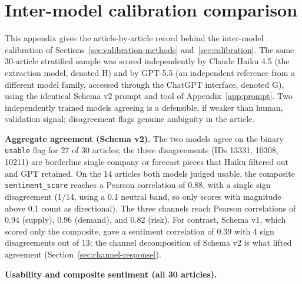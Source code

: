 \chapter{Inter-model calibration comparison}\label{app:calibration}

This appendix gives the article-by-article record behind the inter-model calibration of Sections~\ref{sec:calibration-methods} and~\ref{sec:calibration}. The same 30-article stratified sample was scored independently by Claude Haiku 4.5 (the extraction model, denoted H) and by GPT-5.5 (an independent reference from a different model family, accessed through the ChatGPT interface, denoted G), using the identical Schema v2 prompt and tool of Appendix~\ref{app:prompt}. Two independently trained models agreeing is a defensible, if weaker than human, validation signal; disagreement flags genuine ambiguity in the article.

\textbf{Aggregate agreement (Schema v2).} The two models agree on the binary \texttt{usable} flag for 27 of 30 articles; the three disagreements (IDs 13331, 10308, 10211) are borderline single-company or forecast pieces that Haiku filtered out and GPT retained. On the 14 articles both models judged usable, the composite \texttt{sentiment\_score} reaches a Pearson correlation of 0.88, with a single sign disagreement (1/14, using a 0.1 neutral band, so only scores with magnitude above 0.1 count as directional). The three channels reach Pearson correlations of 0.94 (supply), 0.96 (demand), and 0.82 (risk). For contrast, Schema v1, which scored only the composite, gave a sentiment correlation of 0.39 with 4 sign disagreements out of 13; the channel decomposition of Schema v2 is what lifted agreement (Section~\ref{sec:channel-response}).

\textbf{Usability and composite sentiment (all 30 articles).}

